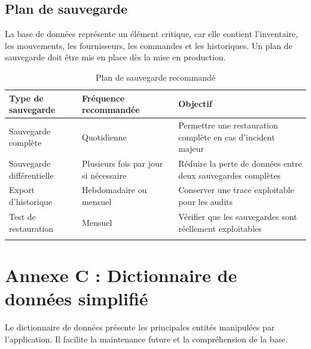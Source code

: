 \subsection*{Plan de sauvegarde}

La base de données représente un élément critique, car elle contient l'inventaire, les mouvements, les fournisseurs, les commandes et les historiques. Un plan de sauvegarde doit être mis en place dès la mise en production.

\begin{longtable}{|m{4cm}|m{4cm}|m{5cm}|}
\hline
\textbf{Type de sauvegarde} & \textbf{Fréquence recommandée} & \textbf{Objectif} \\
\hline
\endhead
\endfoot
\endlastfoot
\hline
Sauvegarde complète & Quotidienne & Permettre une restauration complète en cas d'incident majeur \\
\hline
Sauvegarde différentielle & Plusieurs fois par jour si nécessaire & Réduire la perte de données entre deux sauvegardes complètes \\
\hline
Export d'historique & Hebdomadaire ou mensuel & Conserver une trace exploitable pour les audits \\
\hline
Test de restauration & Mensuel & Vérifier que les sauvegardes sont réellement exploitables \\
\hline
\captionsetup{justification=centering,margin=1cm}
\caption{Plan de sauvegarde recommandé}
\end{longtable}

\section*{Annexe C : Dictionnaire de données simplifié}

Le dictionnaire de données présente les principales entités manipulées par l'application. Il facilite la maintenance future et la compréhension de la base.

